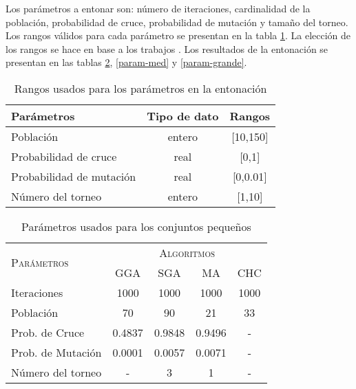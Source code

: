 Los parámetros a entonar son: número de iteraciones, cardinalidad de la población, probabilidad de cruce, probabilidad de mutación y tamaño del torneo. Los rangos válidos para cada parámetro se presentan en la tabla \ref{rangos}. La elección de los rangos se hace en base a los trabajos \cite{de2004reduccion,de2004reduccion,garcia2012prototype,garcia2008memetic,talbi2009metaheuristics}. Los resultados de la entonación se presentan en las tablas \ref{param-peq}, \ref{param-med} y \ref{param-grande}.

\begin{table}[]
\centering
\begin{tabular}{l c c}
\hline
Parámetros & Tipo de dato & Rangos \\
\hline
\hline

Población                & entero           &  [10,150]       \\
Probabilidad de cruce    & real             &  [0,1]          \\
Probabilidad de mutación & real             &  [0,0.01]      \\
Número del torneo        & entero           &  [1,10]         \\  

\hline
\end{tabular}
\caption{Rangos usados para los parámetros en la entonación}
\label{rangos}
\end{table}

\begin{table}[]
\centering
\begin{tabular}{l c c c c}
\hline
\multirow{2}{*}{\textsc{Parámetros}}
	& \multicolumn{4}{c}{\textsc{Algoritmos}} \\
	& GGA & SGA & MA & CHC \\
\hline
\hline
Iteraciones             &  1000    &  1000    &  1000      &  1000 \\
Población               &    70    &    90    &    21      &    33 \\
Prob. de Cruce          &   0.4837 &   0.9848 &     0.9496 &     - \\
Prob. de Mutación       &   0.0001 &  0.0057  &     0.0071 &     - \\
Número del torneo       &   -      &    3     &     1      &     - \\
\hline
\end{tabular}
\caption{Parámetros usados para los conjuntos pequeños}
\label{param-peq}
\end{table}


